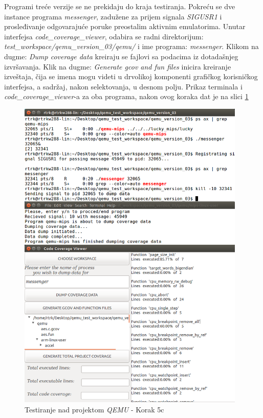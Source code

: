 \documentclass[12pt,oneside]{memoir}
\newcommand{\strano}[1]{\textit{#1}}
\begin{document}
Programi treće verzije se ne prekidaju do kraja testiranja. Pokreću se dve instance programa \strano{messenger}, zadužene za prijem signala \strano{SIGUSR1} i prosleđivanje odgovarajuće poruke preostalim aktivnim emulatorima. Unutar interfejsa \strano{code\_coverage\_viewer}, odabira se radni direktorijum: \\ \strano{test\_workspace/qemu\_version\_03/qemu/} i ime programa: \strano{messenger}. Klikom na dugme: \strano{Dump coverage data} kreiraju se fajlovi sa podacima iz dotadašnjeg izvršavanja. Klik na dugme: \strano{Generate gcov and fun files} inicira kreiranje izveštaja, čija se imena mogu videti u drvolikoj komponenti grafičkog korisničkog interfejsa, a sadržaj, nakon selektovanja, u desnom polju. Prikaz terminala i \strano{code\_coverage\_viewer}-a za oba programa, nakon ovog koraka dat je na slici \ref{fig:qemu-test-5}

\begin{figure}[!ht]
  \centering
  \includegraphics[width=0.97\textwidth]{img/qemu-test-5-ng-ng.png}
  \caption{Testiranje nad projektom \strano{QEMU} - Korak 5c}
  \label{fig:qemu-test-5}
\end{figure} 
\end{document}
